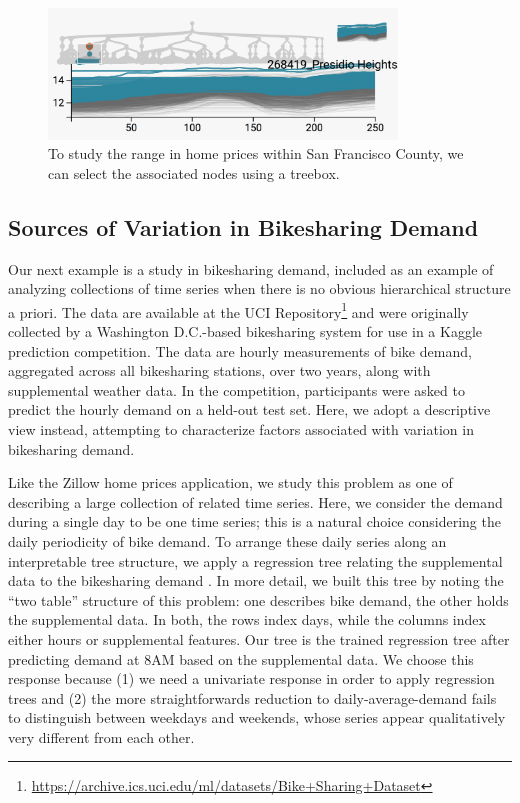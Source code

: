 \documentclass[12pt]{article}
\begin{document}
\begin{figure}

{\centering \includegraphics[width=350px]{figure/zillow_sf}

}

\caption{To study the range in home prices within San Francisco County, we can select the associated nodes using a treebox.}\label{fig:zillowsf}
\end{figure}

\subsection{Sources of Variation in Bikesharing
Demand}\label{bikesharing-study}

Our next example is a study in bikesharing demand, included as an
example of analyzing collections of time series when there is no obvious
hierarchical structure a priori. The data are available at the UCI
Repository\footnote{\url{https://archive.ics.uci.edu/ml/datasets/Bike+Sharing+Dataset}}
and were originally collected by a Washington D.C.-based bikesharing
system for use in a Kaggle prediction competition. The data are hourly
measurements of bike demand, aggregated across all bikesharing stations,
over two years, along with supplemental weather data. In the
competition, participants were asked to predict the hourly demand on a
held-out test set. Here, we adopt a descriptive view instead, attempting
to characterize factors associated with variation in bikesharing demand.

Like the Zillow home prices application, we study this problem as one of
describing a large collection of related time series. Here, we consider
the demand during a single day to be one time series; this is a natural
choice considering the daily periodicity of bike demand. To arrange
these daily series along an interpretable tree structure, we apply a
regression tree relating the supplemental data to the bikesharing demand
\citep{breiman1984classification}. In more
detail, we built this tree by noting the ``two table'' structure of this
problem: one describes bike demand, the other holds the supplemental
data. In both, the rows index days, while the columns index either hours
or supplemental features. Our tree is the trained regression tree after
predicting demand at 8AM based on the supplemental data. We choose this
response because (1) we need a univariate response in order to apply
regression trees and (2) the more straightforwards reduction to
daily-average-demand fails to distinguish between weekdays and weekends,
whose series appear qualitatively very different from each other.
\end{document}
